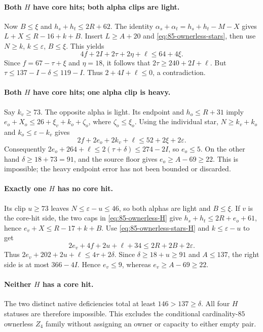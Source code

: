 \documentclass[10pt,a4paper]{article}
\theoremstyle{definition}
\begin{document}
\paragraph{Both $H$ have core hits; both alpha clips are light.}
Now $B\le\xi$ and $h_s+h_t\le2R+62$. The identity
$\alpha_s+\alpha_t=h_s+h_t-M-X$ gives
$L+X\le R-16+k+B$. Insert $L\ge A+20$ and
\eqref{eq:85-ownerless-stars}, then use
$N\ge k$, $k\le\varepsilon$, $B\le\xi$. This yields
\[
 4f+2I+2\tau+2\eta+\ell\le64+4\xi.
\]
Since $f=67-\tau+\xi$ and $\eta=18$, it follows that
$2\tau\ge240+2I+\ell$. But
$\tau\le137-I-\delta\le119-I$. Thus
$2+4I+\ell\le0$, a contradiction.

\paragraph{Both $H$ have core hits; one alpha clip is heavy.}
Say $k_v\ge73$. The opposite alpha is light. Its endpoint and
$h_o\le R+31$ imply
$e_o+X_o\le26+\xi_v+k_o+\zeta_o$, where
$\zeta_o\le\xi_o$. Using the individual star,
$N\ge k_v+k_o$ and $k_o\le\varepsilon-k_v$ gives
\[
 2f+2e_o+2k_v+\ell\le52+2\xi+2\varepsilon.
\]
Consequently $2e_o+264+\ell\le2(\tau+\delta)
\le274-2I$, so $e_o\le5$. On the other hand
$\delta\ge18+73=91$, and the source floor gives
$e_o\ge A-69\ge22$. This is impossible; the heavy endpoint error
has not been bounded or discarded.

\paragraph{Exactly one $H$ has no core hit.}
Its clip $u\ge73$ leaves $N\le\varepsilon-u\le46$, so both alphas
are light and $B\le\xi$. If $v$ is the core-hit side, the two caps
in \eqref{eq:85-ownerless-H} give
$h_s+h_t\le2R+e_o+61$, hence
$e_v+X\le R-17+k+B$. Use
\eqref{eq:85-ownerless-stars-H} and $k\le\varepsilon-u$ to get
\[
 2e_v+4f+2u+\ell+34\le2R+2B+2\varepsilon.
\]
Thus $2e_v+202+2u+\ell\le4\tau+2\delta$.
Since $\delta\ge18+u\ge91$ and $A\le137$,
the right side is at most $366-4I$. Hence $e_v\le9$,
whereas $e_v\ge A-69\ge22$.

\paragraph{Neither $H$ has a core hit.}
The two distinct native deficiencies total at least $146>137\ge\delta$.
All four $H$ statuses are therefore impossible. This excludes the
conditional cardinality-$85$ ownerless $Z_4$ family without assigning
an owner or capacity to either empty pair.
\end{document}
